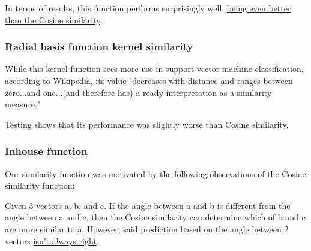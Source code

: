 \documentclass{article}
\begin{document}
In terms of results, this function performs surprisingly well, \underline{being even better} \underline{than the Cosine similarity}.

\subsubsection{Radial basis function kernel similarity}

While this kernel function sees more use in support vector machine classification, according to Wikipedia, its value "decreases with distance and ranges between zero...and one...(and therefore has) a ready interpretation as a similarity measure." 

Testing shows that its performance was slightly worse than Cosine similarity.

\subsubsection{Inhouse function}

Our similarity function was motivated by the following observations of the Cosine similarity function:

Given 3 vectors a, b, and c. If the angle between a and b is different from the angle between a and c, then the Cosine similarity can determine which of b and c are more similar to a. However, said prediction based on the angle between 2 vectors \underline{isn't always right}.
\end{document}
